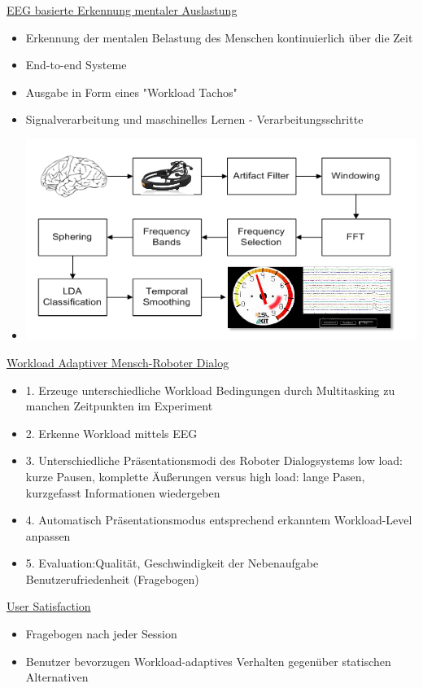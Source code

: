 \documentclass[a4paper,10pt,oneside]{article}
\begin{document}
\underline{EEG basierte Erkennung mentaler Auslastung} \\  	
 	\begin{itemize}
 		\item Erkennung der mentalen Belastung des Menschen kontinuierlich über die Zeit
 		\item End-to-end Systeme
 		\item Ausgabe in Form eines "Workload Tachos"
 		\item Signalverarbeitung und maschinelles Lernen - Verarbeitungsschritte
 		\item[] \includegraphics[scale=0.2]{Grafiken/1956.png}
 	\end{itemize}

\underline{Workload Adaptiver Mensch-Roboter Dialog} \\  
	\begin{itemize}
		\item 1. Erzeuge unterschiedliche Workload Bedingungen durch Multitasking zu manchen Zeitpunkten im Experiment
		\item 2. Erkenne Workload mittels EEG
		\item 3. Unterschiedliche Präsentationsmodi des Roboter Dialogsystems low load: kurze Pausen, komplette Äußerungen versus high load: lange Pasen, kurzgefasst Informationen wiedergeben
		\item 4. Automatisch Präsentationsmodus entsprechend erkanntem Workload-Level anpassen
		\item 5. Evaluation:Qualität, Geschwindigkeit der Nebenaufgabe
Benutzerufriedenheit (Fragebogen)
	\end{itemize}
 		
\underline{User Satisfaction} \\  
	\begin{itemize}
		\item Fragebogen nach jeder Session
		\item Benutzer bevorzugen Workload-adaptives Verhalten gegenüber statischen Alternativen
	\end{itemize}
	
\end{document}

